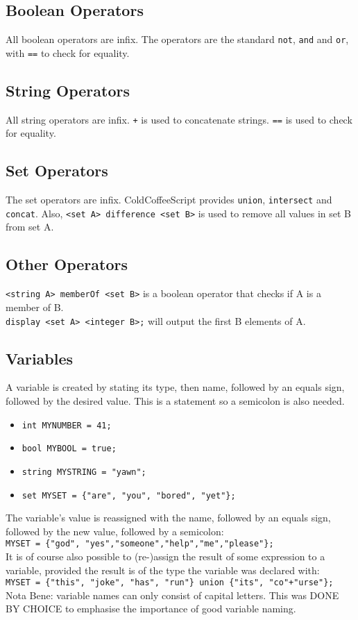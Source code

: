 \documentclass{article}
\begin{document}
\subsection{Boolean Operators}
All boolean operators are infix. The operators are the standard \lstinline|not|, \lstinline|and| and \lstinline|or|, with \lstinline|==| to check for equality.
\subsection{String Operators}
All string operators are infix. \lstinline|+| is used to concatenate strings. \lstinline|==| is used to check for equality.
\subsection{Set Operators}
The set operators are infix. ColdCoffeeScript provides \lstinline|union|, \lstinline|intersect| and \lstinline|concat|. Also, \lstinline|<set A> difference <set B>| is used to remove all values in set B from set A.
\subsection{Other Operators}
\lstinline|<string A> memberOf <set B>| is a boolean operator that checks if A is a member of B.\\
\lstinline|display <set A> <integer B>;| will output the first B elements of A.
\subsection{Variables}
A variable is created by stating its type, then name, followed by an equals sign, followed by the desired value. This is a statement so a semicolon is also needed.
\begin{itemize}
\item \lstinline|int MYNUMBER = 41;|
\item \lstinline|bool MYBOOL = true;|
\item \lstinline|string MYSTRING = "yawn";|
\item \lstinline|set MYSET = {"are", "you", "bored", "yet"};|
\end{itemize}
The variable's value is reassigned with the name, followed by an equals sign, followed by the new value, followed by a semicolon: \\
\lstinline|MYSET = {"god", "yes","someone","help","me","please"};| \\
It is of course also possible to (re-)assign the result of some expression to a variable, provided the result is of the type the variable was declared with: \\
\lstinline|MYSET = {"this", "joke", "has", "run"} union {"its", "co"+"urse"};| \\
Nota Bene: variable names can only consist of capital letters. This was DONE BY CHOICE to emphasise the importance of good variable naming.
\end{document}
